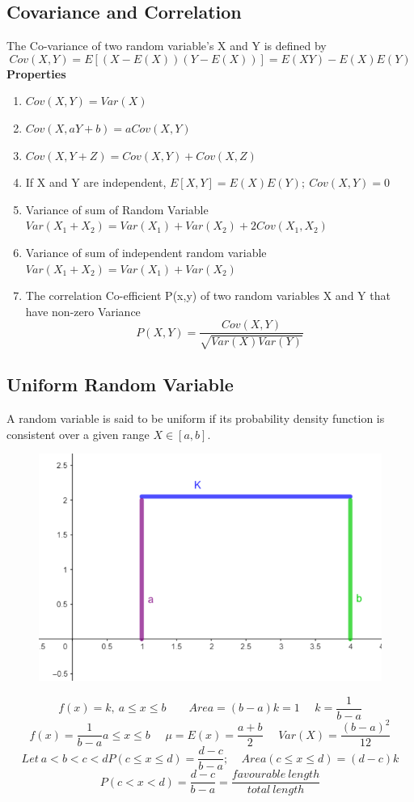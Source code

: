 \subsection*{Covariance and Correlation}
The Co-variance of two random variable's X and Y is defined by
\[Cov(X, Y)=E[(X-E(X))(Y-E(X))]=E(XY)-E(X)E(Y)\]
\textbf{Properties}
\begin{enumerate}
    \item \(Cov(X,Y) = Var(X)\)
    \item \(Cov(X,aY+b) = aCov(X,Y)\)
    \item \(Cov(X,Y+Z)=Cov(X,Y)+Cov(X,Z)\)
    \item If X and Y are independent, \(E[X,Y]=E(X)E(Y);\ Cov(X,Y)=0\)
    \item Variance of sum of Random Variable \(Var(X_1+X_2)=Var(X_1)+Var(X_2)+2Cov(X_1, X_2)\)
    \item Variance of sum of independent random variable \(Var(X_1+X_2)=Var(X_1)+Var(X_2)\)
    \item The correlation Co-efficient P(x,y) of two random variables X and Y that have non-zero Variance
    \[P(X, Y)=\frac{Cov(X,Y)}{\sqrt{Var(X)Var(Y)}}\]
\end{enumerate}


\subsection{Uniform Random Variable}
A random variable is said to be uniform if its probability density function is consistent over a given range \(X \in [a,b].\)
\begin{figure}[h!]
    \centering
    \includegraphics[scale=0.45]{images/uniform-distribution.png}
\end{figure}
\[f(x)= k,\ a\leq x \leq b\ \ \ \ \ \ \ \ \ Area=(b-a)k=1\ \ \ \ \ \ k=\frac{1}{b-a}\]
\[f(x) = \frac{1}{b-a} a \leq x \leq b\ \ \ \ \ \ \mu=E(x)=\frac{a+b}{2}\ \ \ \ \ \ Var(X)=\frac{(b-a)^2}{12}\]
\[Let\ a<b<c<d P(c\leq x \leq d)=\frac{d-c}{b-a};\ \ \ \ \ Area(c\leq x\leq d)=(d-c)k\]
\[P(c<x<d)=\frac{d-c}{b-a}=\frac{favourable\ length}{total\ length}\]


